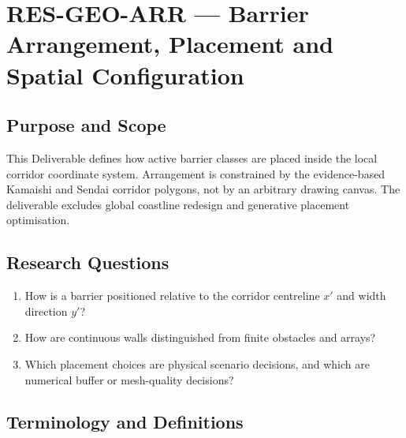 
\section{RES-GEO-ARR --- Barrier Arrangement, Placement and Spatial Configuration}
\label{sec:res-geo-arr}

\subsection{Purpose and Scope}
\label{sec:res-geo-arr-purpose}

This Deliverable defines how active barrier classes are placed inside
the local corridor coordinate system. Arrangement is constrained by
the evidence-based Kamaishi and Sendai corridor polygons, not by an
arbitrary drawing canvas. The deliverable excludes global coastline
redesign and generative placement optimisation.

\subsection{Research Questions}
\label{sec:res-geo-arr-research-questions}

\begin{enumerate}
  \item How is a barrier positioned relative to the corridor
    centreline $x'$ and width direction $y'$?
  \item How are continuous walls distinguished from finite obstacles
    and arrays?
  \item Which placement choices are physical scenario decisions, and
    which are numerical buffer or mesh-quality decisions?
\end{enumerate}

\subsection{Terminology and Definitions}
\label{sec:res-geo-arr-definitions}

